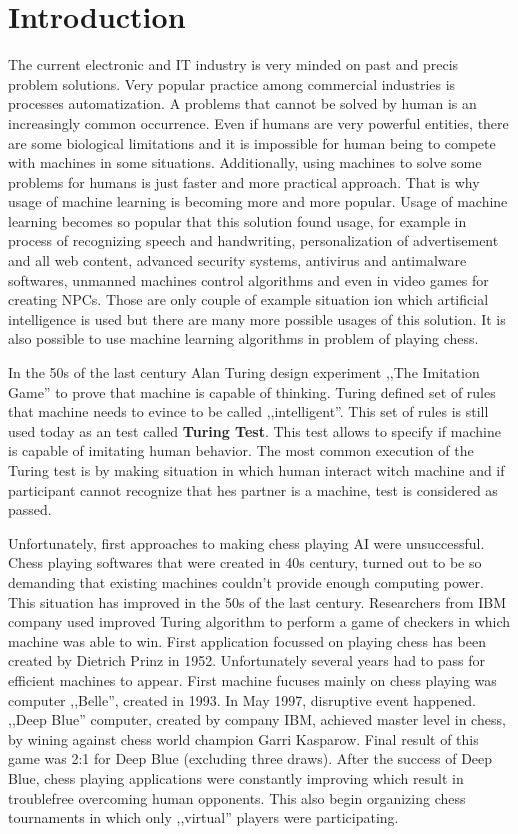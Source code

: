 \chapter{Introduction}
The current electronic and IT industry is very minded on past and precis problem solutions. Very popular practice among commercial industries is processes automatization. A problems that cannot be solved by human is an increasingly common occurrence. Even if humans are very powerful entities, there are some biological limitations and it is impossible for human being to compete with machines in some situations. Additionally, using machines to solve some problems for humans is just faster and more practical approach. That is why usage of machine learning is becoming more and more popular. Usage of machine learning becomes so popular that this solution found usage, for example in process of recognizing speech and handwriting, personalization of advertisement and all web content, advanced security systems, antivirus and antimalware softwares, unmanned machines control algorithms and even in video games for creating NPCs. Those are only couple of example situation ion which artificial intelligence is used but there are many more possible usages of this solution. It is also possible to use machine learning algorithms in problem of playing chess.

In the 50s of the last century Alan Turing design experiment ,,The Imitation Game'' to prove that machine is capable of thinking. Turing defined set of rules that machine needs to evince to be called ,,intelligent''. This set of rules is still used today as an test called \textbf{Turing Test}. This test allows to specify if machine is capable of imitating human behavior. The most common execution of the Turing test is by making situation in which human interact witch machine and if participant cannot recognize that hes partner is a machine, test is considered as passed. 

Unfortunately, first approaches to making chess playing AI were unsuccessful. Chess playing softwares that were created in 40s century, turned out to be so demanding that existing machines couldn't provide enough computing power. This situation has improved in the 50s of the last century. Researchers from IBM company used improved Turing algorithm to perform a game of checkers in which machine was able to win. First application focussed on playing chess has been created by Dietrich Prinz in 1952. Unfortunately several years had to pass for efficient machines to appear. First machine fucuses mainly on chess playing was computer ,,Belle'', created in 1993. In May 1997, disruptive event happened. ,,Deep Blue'' computer, created by company IBM, achieved master level in chess, by wining against chess world champion Garri Kasparow. Final result of this game was 2:1 for Deep Blue (excluding three draws). After the success of Deep Blue, chess playing applications were constantly improving which result in troublefree overcoming human opponents. This also begin organizing chess tournaments in which only ,,virtual'' players were participating.

